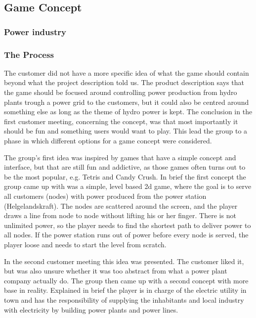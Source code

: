 \subsection{Game Concept}

\subsubsection{Power industry}

\subsubsection{The Process}

The customer did not have a more specific idea of what the game should contain
beyond what the project description told us. The product description says
that the game should be focused around controlling power production from
hydro plants trough a power grid to the customers, but it could also be
centred around something else as long as the theme of hydro power is kept. The
conclusion in the first customer meeting, concerning the concept, was that
most importantly it should be fun and something users would want to play. This
lead the group to a phase in which different options for a game concept were
considered.

The group's first idea was inspired by games that have a simple concept and
interface, but that are still fun and addictive, as those games often turns out
to be the most popular, e.g. Tetris and Candy Crush. In brief the first concept
the group came up with was a simple, level based 2d game, where the goal is
to serve all customers (nodes) with power produced from the power station
(Helgelandskraft). The nodes are scattered around the screen, and the player
draws a line from node to node without lifting his or her finger. There is
not unlimited power, so the player needs to find the shortest path to deliver
power to all nodes. If the power station runs out of power before every node is
served, the player loose and needs to start the level from scratch.

In the second customer meeting this idea was presented. The customer liked it,
but was also unsure whether it was too abstract from what a power plant company
actually do. The group then came up with a second concept with more base in
reality. Explained in brief the player is in charge of the electric utility in
town and has the responsibility of supplying the inhabitants and local industry
with electricity by building power plants and power lines.

